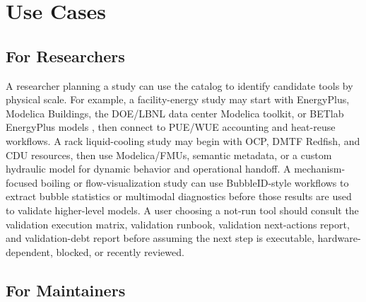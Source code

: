 \documentclass[11pt]{article}
\begin{document}
\section{Use Cases}

\subsection{For Researchers}

A researcher planning a study can use the catalog to identify candidate tools by physical scale. For example, a facility-energy study may start with EnergyPlus, Modelica Buildings, the DOE/LBNL data center Modelica toolkit, or BETlab EnergyPlus models \cite{EnergyPlusDOE2026,ModelicaBuildings2026,PSUDataCenterModelica2026,BETlabDataCenterModeling2026}, then connect to PUE/WUE accounting and heat-reuse workflows. A rack liquid-cooling study may begin with OCP, DMTF Redfish, and CDU resources, then use Modelica/FMUs, semantic metadata, or a custom hydraulic model for dynamic behavior and operational handoff. A mechanism-focused boiling or flow-visualization study can use BubbleID-style workflows to extract bubble statistics or multimodal diagnostics before those results are used to validate higher-level models. A user choosing a not-run tool should consult the validation execution matrix, validation runbook, validation next-actions report, and validation-debt report before assuming the next step is executable, hardware-dependent, blocked, or recently reviewed.

\subsection{For Maintainers}
\end{document}
